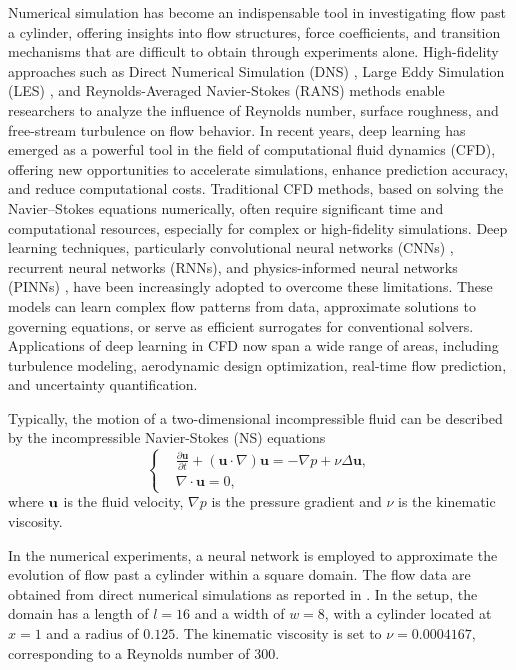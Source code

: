\documentclass[final]{siamart220329}
\newtheorem{theoretical insights}{Theoretical insights}
\newtheorem{practical takeaway}{Practical takeaway}
\begin{document}
{Numerical simulation has become an indispensable tool in investigating flow past a cylinder, offering insights into flow structures, force coefficients, and transition mechanisms that are difficult to obtain through experiments alone. High-fidelity approaches such as Direct Numerical Simulation (DNS) \cite{moin1998direct}, Large Eddy Simulation (LES) \cite{mason1994large}, and Reynolds-Averaged Navier-Stokes (RANS) methods \cite{alfonsi2009reynolds} enable researchers to analyze the influence of Reynolds number, surface roughness, and free-stream turbulence on flow behavior. 
In recent years, deep learning has emerged as a powerful tool in the field of computational fluid dynamics (CFD), offering new opportunities to accelerate simulations, enhance prediction accuracy, and reduce computational costs. Traditional CFD methods, based on solving the Navier–Stokes equations numerically, often require significant time and computational resources, especially for complex or high-fidelity simulations. Deep learning techniques, particularly convolutional neural networks (CNNs) \cite{guo2016convolutional}, recurrent neural networks (RNNs), and physics-informed neural networks (PINNs) \cite{wang2025simulating}, have been increasingly adopted to overcome these limitations. These models can learn complex flow patterns from data, approximate solutions to governing equations, or serve as efficient surrogates for conventional solvers. Applications of deep learning in CFD now span a wide range of areas, including turbulence modeling, aerodynamic design optimization, real-time flow prediction, and uncertainty quantification.

Typically, the motion of a two-dimensional incompressible fluid can be described by the incompressible Navier-Stokes (NS) equations 
\begin{equation}\label{NS}
\left\{
\begin{aligned}
&\frac{\partial \mathbf{u}}{\partial t} + (\mathbf{u}\cdot\nabla)\mathbf{u} = -\nabla p + \nu \Delta \mathbf{u},\\
&\nabla\cdot\mathbf{u} = 0, 
\end{aligned}
\right.
\end{equation}
where ${\bf u}$ is the fluid velocity, $\nabla p$ is the pressure gradient and $\nu$ is the kinematic viscosity.

In the numerical experiments, a neural network is employed to approximate the evolution of flow past a cylinder within a square domain. The flow data are obtained from direct numerical simulations as reported in \cite{trebotich2015adaptive}. In the setup, the domain has a length of $l = 16$ and a width of $w = 8$, with a cylinder located at $x = 1$ and a radius of $0.125$. The kinematic viscosity is set to $\nu = 0.0004167$, corresponding to a Reynolds number of $300$.

}
\end{document}
